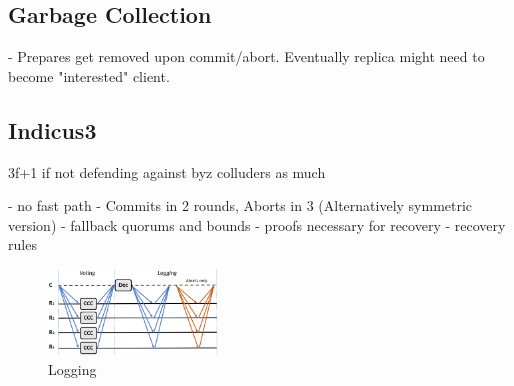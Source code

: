 \subsection{Garbage Collection}
- Prepares get removed upon commit/abort. Eventually replica might need to become "interested" client.

\subsection{Indicus3}
3f+1 if not defending against byz colluders as much

- no fast path
- Commits in 2 rounds, Aborts in 3 (Alternatively symmetric version)
- fallback quorums and bounds
- proofs necessary for recovery
- recovery rules

\begin{figure}
\begin{center}
\includegraphics[width= 0.4\textwidth]{./figures/3f+1.png}
\end{center}
\caption{Logging}
\label{fig:Figure1}
\end{figure}


